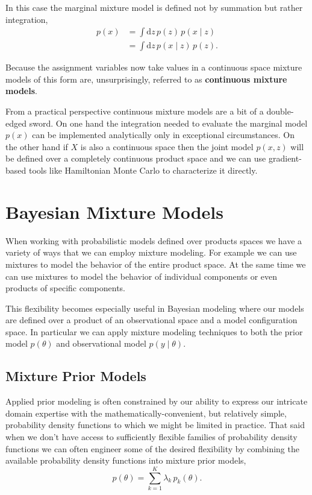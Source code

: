 \documentclass[
  letterpaper,
  DIV=11,
  numbers=noendperiod]{scrartcl}
\begin{document}
In this case the marginal mixture model is defined not by summation but
rather integration, \begin{align*}
p(x)
&=
\int \mathrm{d} z \, p(z) \, p(x \mid z)
\\
&=
\int \mathrm{d} z \, p(x \mid z) \, p(z).
\end{align*}

Because the assignment variables now take values in a continuous space
mixture models of this form are, unsurprisingly, referred to as
\textbf{continuous mixture models}.

From a practical perspective continuous mixture models are a bit of a
double-edged sword. On one hand the integration needed to evaluate the
marginal model \(p(x)\) can be implemented analytically only in
exceptional circumstances. On the other hand if \(X\) is also a
continuous space then the joint model \(p(x, z)\) will be defined over a
completely continuous product space and we can use gradient-based tools
like Hamiltonian Monte Carlo to characterize it directly.

\section{Bayesian Mixture Models}\label{bayesian-mixture-models}

When working with probabilistic models defined over products spaces we
have a variety of ways that we can employ mixture modeling. For example
we can use mixtures to model the behavior of the entire product space.
At the same time we can use mixtures to model the behavior of individual
components or even products of specific components.

This flexibility becomes especially useful in Bayesian modeling where
our models are defined over a product of an observational space and a
model configuration space. In particular we can apply mixture modeling
techniques to both the prior model \(p( \theta )\) and observational
model \(p(y \mid \theta)\).

\subsection{Mixture Prior Models}\label{mixture-prior-models}

Applied prior modeling is often constrained by our ability to express
our intricate domain expertise with the mathematically-convenient, but
relatively simple, probability density functions to which we might be
limited in practice. That said when we don't have access to sufficiently
flexible families of probability density functions we can often engineer
some of the desired flexibility by combining the available probability
density functions into mixture prior models, \[
p(\theta) = \sum_{k = 1}^{K} \lambda_{k} \, p_{k}(\theta).
\]
\end{document}
